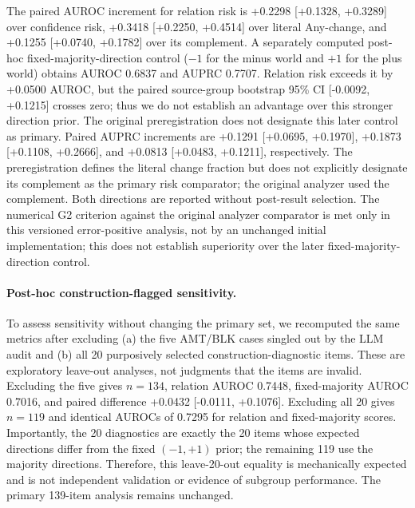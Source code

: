 \documentclass[11pt]{article}
\begin{document}
The paired AUROC increment for relation risk is +0.2298 [+0.1328, +0.3289] over confidence risk, +0.3418 [+0.2250, +0.4514] over literal Any-change, and +0.1255 [+0.0740, +0.1782] over its complement. A separately computed post-hoc fixed-majority-direction control ($-1$ for the minus world and $+1$ for the plus world) obtains AUROC 0.6837 and AUPRC 0.7707. Relation risk exceeds it by +0.0500 AUROC, but the paired source-group bootstrap 95\% CI [-0.0092, +0.1215] crosses zero; thus we do not establish an advantage over this stronger direction prior. The original preregistration does not designate this later control as primary. Paired AUPRC increments are +0.1291 [+0.0695, +0.1970], +0.1873 [+0.1108, +0.2666], and +0.0813 [+0.0483, +0.1211], respectively. The preregistration defines the literal change fraction but does not explicitly designate its complement as the primary risk comparator; the original analyzer used the complement. Both directions are reported without post-result selection. The numerical G2 criterion against the original analyzer comparator is met only in this versioned error-positive analysis, not by an unchanged initial implementation; this does not establish superiority over the later fixed-majority-direction control.

\paragraph{Post-hoc construction-flagged sensitivity.} To assess sensitivity without changing the primary set, we recomputed the same metrics after excluding (a) the five AMT/BLK cases singled out by the LLM audit and (b) all 20 purposively selected construction-diagnostic items. These are exploratory leave-out analyses, not judgments that the items are invalid. Excluding the five gives $n=134$, relation AUROC 0.7448, fixed-majority AUROC 0.7016, and paired difference +0.0432 [-0.0111, +0.1076]. Excluding all 20 gives $n=119$ and identical AUROCs of 0.7295 for relation and fixed-majority scores. Importantly, the 20 diagnostics are exactly the 20 items whose expected directions differ from the fixed $(-1,+1)$ prior; the remaining 119 use the majority directions. Therefore, this leave-20-out equality is mechanically expected and is not independent validation or evidence of subgroup performance. The primary 139-item analysis remains unchanged.
\end{document}
